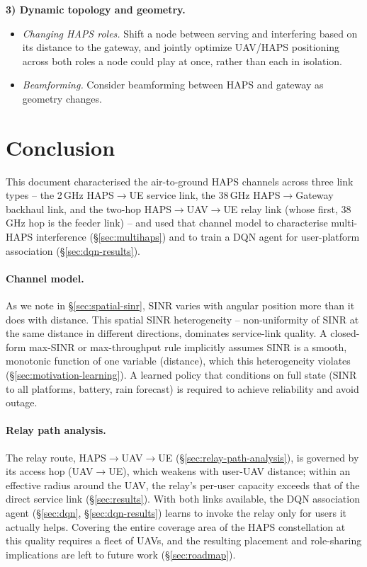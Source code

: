 \documentclass[]{ieeeaccess}
\begin{document}
\textbf{3) Dynamic topology and geometry.}
\begin{itemize}\setlength{\itemsep}{1pt}
  \item \emph{Changing HAPS roles.} Shift a node between serving and interfering based on its distance to the gateway, and jointly optimize UAV/HAPS positioning across both roles a node could play at once, rather than each in isolation.
  \item \emph{Beamforming.} Consider beamforming between HAPS and gateway as geometry changes.
\end{itemize}

\section{Conclusion}
\label{sec:conclusion}

This document characterised the air-to-ground HAPS channels
across three link types -- the 2\,GHz HAPS$\rightarrow$UE service link,
the 38\,GHz HAPS$\rightarrow$Gateway backhaul link, and the two-hop
HAPS$\rightarrow$UAV$\rightarrow$UE relay link (whose first, 38\,GHz hop is
the feeder link) -- and used that channel
model to characterise multi-HAPS interference (\S\ref{sec:multihaps})
and to
train a DQN agent for user-platform association (\S\ref{sec:dqn-results}).

\paragraph{Channel model.} As we note in \S\ref{sec:spatial-sinr}, SINR varies with angular position more than it does with distance. This spatial SINR heterogeneity -- non-uniformity of SINR at the same distance in different directions, dominates service-link quality. A closed-form max-SINR or max-throughput rule implicitly assumes SINR is a smooth, monotonic function of one variable (distance), which this heterogeneity violates (\S\ref{sec:motivation-learning}). A learned policy that conditions on full state (SINR to all platforms, battery, rain forecast) is required to achieve reliability and avoid outage.

\paragraph{Relay path analysis.} The relay route, HAPS$\rightarrow$UAV$\rightarrow$UE
(\S\ref{sec:relay-path-analysis}), is governed by its access hop (UAV$\rightarrow$UE),
which weakens with user-UAV distance; within an effective radius around the UAV,
the relay's per-user capacity exceeds that of the direct service link
(\S\ref{sec:results}). With both links available, the DQN association agent
(\S\ref{sec:dqn}, \S\ref{sec:dqn-results}) learns to invoke the relay only for
users it actually helps. Covering the entire coverage area of the HAPS
constellation at this quality requires a fleet of UAVs, and the resulting
placement and role-sharing implications are left to future work
(\S\ref{sec:roadmap}).
\end{document}
